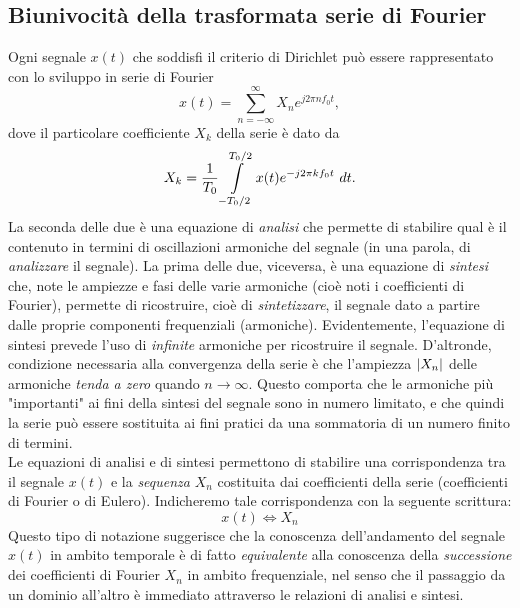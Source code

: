 \documentclass[12pt,oneside,openany]{memoir}
\numberwithin{equation}{subsection}
\DeclarePairedDelimiter{\abs}{\lvert}{\rvert}
\newcommand{\dt}{\ dt}
\begin{document}
\subsection{Biunivocit\`a della trasformata serie di Fourier}
Ogni segnale $x(t)$ che soddisfi il criterio di Dirichlet pu\`o essere
rappresentato con lo sviluppo in serie di Fourier
\begin{equation}
	x(t) = \sum_{n = -\infty}^{\infty} X_n e^{j 2 \pi n f_0 t},
\end{equation}
dove il particolare coefficiente $X_k$ della serie \`e dato da
\begin{equation}
	X_k = \frac{1}{T_0} \int\displaylimits_{-T_0/2}^{T_0/2} x(t)
	e^{-j 2 \pi k f_0 t} \dt.
\end{equation}
La seconda delle due \`e una equazione di \textit{analisi} che permette di
stabilire qual \`e il contenuto in termini di oscillazioni armoniche del segnale
(in una parola, di \textit{analizzare} il segnale). La prima delle due,
viceversa, \`e una equazione di \textit{sintesi} che, note le ampiezze e fasi
delle varie armoniche (cio\`e noti i coefficienti di Fourier), permette di
ricostruire, cio\`e di \textit{sintetizzare}, il segnale dato a partire dalle
proprie componenti frequenziali (armoniche). Evidentemente, l'equazione di
sintesi prevede l'uso di \textit{infinite} armoniche per ricostruire il segnale.
D'altronde, condizione necessaria alla convergenza della serie \`e che
l'ampiezza $\abs{X_n}$ delle armoniche \textit{tenda a zero} quando
$n \rightarrow \infty$. Questo comporta che le armoniche pi\`u "importanti" ai
fini della sintesi del segnale sono in numero limitato, e che quindi la serie
pu\`o essere sostituita ai fini pratici da una sommatoria di un numero finito di
termini.\\
Le equazioni di analisi e di sintesi permettono di stabilire una corrispondenza
tra il segnale $x(t)$ e la \textit{sequenza} $X_n$ costituita dai coefficienti
della serie (coefficienti di Fourier o di Eulero). Indicheremo tale
corrispondenza con la seguente scrittura:
\begin{equation}
	x(t) \iff X_n
\end{equation}
Questo tipo di notazione suggerisce che la conoscenza dell'andamento del segnale
$x(t)$ in ambito temporale \`e di fatto \textit{equivalente} alla conoscenza
della \textit{successione} dei coefficienti di Fourier $X_n$ in ambito
frequenziale, nel senso che il passaggio da un dominio all'altro \`e immediato
attraverso le relazioni di analisi e sintesi.
\end{document}
